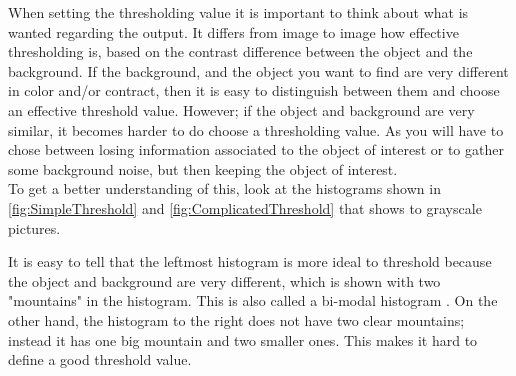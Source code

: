 When setting the thresholding value it is important to think about what is wanted regarding the output. It differs  from image to image how effective thresholding is, based on the contrast difference between the object and the background. If the background, and the object you want to find are very different in color and/or contract, then it is easy to distinguish between them and choose an effective threshold value. However; if the object and background are very similar, it becomes harder to do choose a thresholding value. As you will have to chose between losing information associated to the object of interest or to gather some background noise, but then keeping the object of interest.\\
To get a better understanding of this, look at the histograms shown in \ref{fig:SimpleThreshold} and \eqref{fig:ComplicatedThreshold} that shows to grayscale pictures.

It is easy to tell that the leftmost histogram is more ideal to threshold because the object and background are very different, which is shown with two "mountains" in the histogram. This is also called a bi-modal histogram \citep{ip_book}. On the other hand, the histogram to the right does not have two clear mountains; instead it has one big mountain and two smaller ones. This makes it hard to define a good threshold value.

